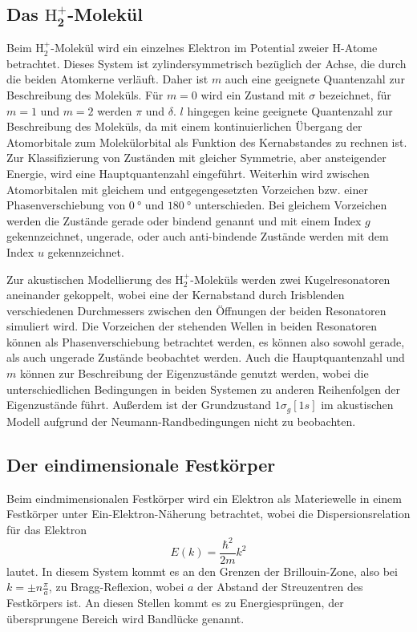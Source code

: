 \subsection[Das $\mathrm{H}_2^{+}$-Molekül]{Das $\symbf{\mathrm{H}_2^{+}}$-Molekül}
Beim $\mathrm{H}_2^{+}$-Molekül wird ein einzelnes Elektron im Potential zweier H-Atome betrachtet. Dieses System ist zylindersymmetrisch bezüglich der Achse, die durch die beiden Atomkerne verläuft. Daher ist $m$ auch eine geeignete Quantenzahl zur Beschreibung des Moleküls. Für $m=0$ wird ein Zustand mit $\sigma$ bezeichnet, für $m=1$ und $m=2$ werden $\pi$ und $\delta$. $l$ hingegen keine geeignete Quantenzahl zur Beschreibung des Moleküls, da mit einem kontinuierlichen Übergang der Atomorbitale zum Molekülorbital als Funktion des Kernabstandes zu rechnen ist. Zur Klassifizierung von Zuständen mit gleicher Symmetrie, aber ansteigender Energie, wird eine Hauptquantenzahl eingeführt.
Weiterhin wird zwischen Atomorbitalen mit gleichem und entgegengesetzten Vorzeichen  bzw. einer Phasenverschiebung von $\SI{0}{\degree}$ und $\SI{180}{\degree}$ unterschieden. Bei gleichem Vorzeichen werden die Zustände gerade oder bindend genannt und mit einem Index $g$ gekennzeichnet, ungerade, oder auch anti-bindende Zustände werden mit dem Index $u$ gekennzeichnet.

Zur akustischen Modellierung des $\mathrm{H}_2^{+}$-Moleküls werden zwei Kugelresonatoren aneinander gekoppelt, wobei eine der Kernabstand durch Irisblenden verschiedenen Durchmessers zwischen den Öffnungen der beiden Resonatoren simuliert wird. Die Vorzeichen der stehenden Wellen in beiden Resonatoren können als Phasenverschiebung betrachtet werden, es können also sowohl gerade, als auch ungerade Zustände beobachtet werden. Auch die Hauptquantenzahl und $m$ können zur Beschreibung der Eigenzustände genutzt werden, wobei die unterschiedlichen Bedingungen in beiden Systemen zu anderen Reihenfolgen der Eigenzustände führt. Außerdem ist der Grundzustand $1\sigma_g [1s]$ im akustischen Modell aufgrund der Neumann-Randbedingungen nicht zu beobachten.

\subsection{Der eindimensionale Festkörper}
Beim eindmimensionalen Festkörper wird ein Elektron als Materiewelle in einem Festkörper unter Ein-Elektron-Näherung betrachtet, wobei die Dispersionsrelation für das Elektron
\begin{equation}
  E (k) = \frac{\hbar^2}{2m} k^2
  \label{eq:dispersion_qm}
\end{equation}
lautet. In diesem System kommt es an den Grenzen der Brillouin-Zone, also bei $k = \pm n \frac{\pi}{a}$, zu Bragg-Reflexion, wobei $a$ der Abstand der Streuzentren des Festkörpers ist. An diesen Stellen kommt es zu Energiesprüngen, der übersprungene Bereich wird Bandlücke genannt.

